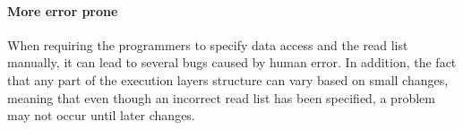 \paragraph{More error prone} 
When requiring the programmers to specify data access and the read list manually, it can lead to several bugs caused by human error.
In addition, the fact that any part of the execution layers structure can vary based on small changes, meaning that even though an incorrect read list has been specified, a problem may not occur until later changes.
